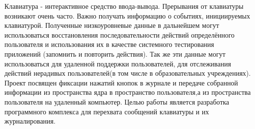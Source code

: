 \Introduction

Клавиатура - интерактивное средство ввода-вывода. Прерывания от клавиатуры возникают очень часто.
Важно получать информацию о событиях, инициируемых клавиатурой.  Полученные низкоуровневые данные в дальнейшем могут использоваться
восстановления последовательности действий определённого пользователя и использования их в качестве системного тестирования приложений (запомнить и повторить действия). 
Так же эти данные могут использоваться для удаленной поддержки пользователей, для отслеживания действий нерадивых пользователей(в том числе в образовательных учреждениях).
Проект посвящен фиксации нажатий кнопок  в журнале и передаче
собранной информации из пространства ядра в пространство пользователя,а из пространства пользователя на удаленный компьютер.
Целью работы является разработка программного комплекса для перехвата сообщений клавиатуры и их журналирования.